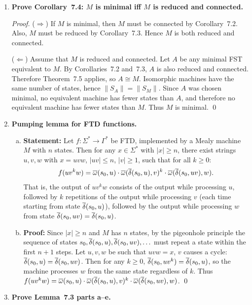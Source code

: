 \begin{enumerate}[{7.}1.]
\item \textbf{Prove Corollary~7.4: $M$ is minimal iff $M$ is reduced and connected.}

\begin{proof}
($\Rightarrow$) If $M$ is minimal, then $M$ must be connected by
Corollary~7.2.  Also, $M$ must be reduced by Corollary~7.3.  Hence $M$ is both
reduced and connected.

($\Leftarrow$) Assume that $M$ is reduced and connected.  Let $A$ be any minimal
FST equivalent to $M$.  By Corollaries~7.2 and~7.3, $A$ is also reduced and
connected.  Therefore Theorem~7.5 applies, so $A\cong M$.  Isomorphic machines
have the same number of states, hence $\|S_A\|=\|S_M\|$.  Since $A$ was chosen
minimal, no equivalent machine has fewer states than $A$, and therefore no
equivalent machine has fewer states than $M$.  Thus $M$ is minimal. \qed
\end{proof}

\item \textbf{Pumping lemma for FTD functions.}

\begin{enumerate}[(a)]
  \item \textbf{Statement:}  Let $f:\Sigma^*\to\Gamma^*$ be FTD, implemented by a Mealy machine $M$ with $n$ states.  Then for any $x\in\Sigma^*$ with $|x|\ge n$, there exist strings $u,v,w$ with $x=uvw$, $|uv|\le n$, $|v|\ge 1$, such that for all $k\ge 0$:
  \[
    f(uv^kw) = \overline{\omega}(s_0,u)\cdot\overline{\omega}(\overline{\delta}(s_0,u),v)^k\cdot\overline{\omega}(\overline{\delta}(s_0,uv),w).
  \]
  That is, the output of $uv^kw$ consists of the output while processing $u$, followed by $k$ repetitions of the output while processing $v$ (each time starting from state $\overline{\delta}(s_0,u)$), followed by the output while processing $w$ from state $\overline{\delta}(s_0,uv)=\overline{\delta}(s_0,u)$.

  \item \textbf{Proof:}  Since $|x|\ge n$ and $M$ has $n$ states, by the pigeonhole principle the sequence of states $s_0,\overline{\delta}(s_0,u),\overline{\delta}(s_0,uv),\ldots$ must repeat a state within the first $n+1$ steps.  Let $u,v,w$ be such that $uvw=x$, $v$ causes a cycle: $\overline{\delta}(s_0,u)=\overline{\delta}(s_0,uv)$.  Then for any $k\ge 0$, $\overline{\delta}(s_0,uv^k)=\overline{\delta}(s_0,u)$, so the machine processes $w$ from the same state regardless of $k$.  Thus $f(uv^kw)=\overline{\omega}(s_0,u)\cdot\overline{\omega}(\overline{\delta}(s_0,u),v)^k\cdot\overline{\omega}(\overline{\delta}(s_0,uv),w)$.  \qed
\end{enumerate}

\item \textbf{Prove Lemma~7.3 parts a--e.}


\end{enumerate}
